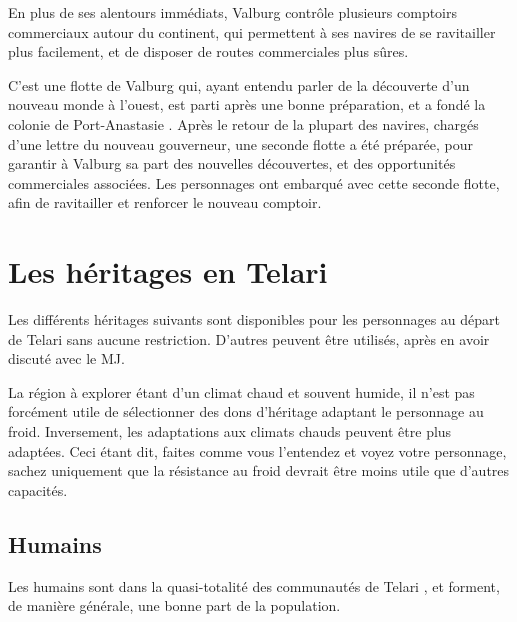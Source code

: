 \documentclass[10pt,a4paper]{book}
\newcommand{\nomcolonie}{Port-Anastasie }
\newcommand{\nomorigine}{Telari }
\begin{document}
En plus de ses alentours immédiats, Valburg contrôle plusieurs comptoirs commerciaux autour du continent, qui permettent à ses navires de se ravitailler plus facilement, et de disposer de routes commerciales plus sûres.

C'est une flotte de Valburg qui, ayant entendu parler de la découverte d'un nouveau monde à l'ouest, est parti après une bonne préparation, et a fondé la colonie de \nomcolonie. Après le retour de la plupart des navires, chargés d'une lettre du nouveau gouverneur, une seconde flotte a été préparée, pour garantir à Valburg sa part des nouvelles découvertes, et des opportunités commerciales associées. Les personnages ont embarqué avec cette seconde flotte, afin de ravitailler et renforcer le nouveau comptoir.
\section{Les héritages en \nomorigine}
Les différents héritages suivants sont disponibles pour les personnages au départ de \nomorigine sans aucune restriction. D'autres peuvent être utilisés, après en avoir discuté avec le MJ.

La région à explorer étant d'un climat chaud et souvent humide, il n'est pas forcément utile de sélectionner des dons d'héritage adaptant le personnage au froid. Inversement, les adaptations aux climats chauds peuvent être plus adaptées. Ceci étant dit, faites comme vous l'entendez et voyez votre personnage, sachez uniquement que la résistance au froid devrait être moins utile que d'autres capacités.
\subsection{Humains}
Les humains sont dans la quasi-totalité des communautés de \nomorigine, et forment, de manière générale, une bonne part de la population. 
\end{document}

